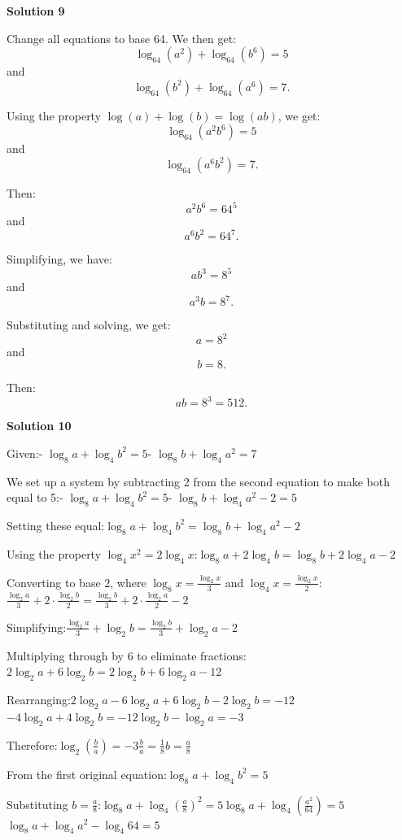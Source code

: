 \begin{enumerate}
 



\textbf{Solution 9}

Change all equations to base 64. We then get:
 \[\log_{64}(a^2) + \log_{64}(b^6) = 5\]and
 \[\log_{64}(b^2) + \log_{64}(a^6) = 7.\]

 Using the property \(\log(a) + \log(b) = \log(ab)\), we get:
 \[\log_{64}(a^2b^6) = 5\]and
 \[\log_{64}(a^6b^2) = 7.\]

 Then:
 \[a^2b^6 = 64^5\]and
 \[a^6b^2 = 64^7.\]

 Simplifying, we have:
 \[ab^3 = 8^5\]and
 \[a^3b = 8^7.\]

 Substituting and solving, we get:
 \[a = 8^2\]and
 \[b = 8.\]

 Then:
 \[ab = 8^3 = 512.\]




\textbf{Solution 10}

Given:- $\log_8 a + \log_4 b^2 = 5$- $\log_8 b + \log_4 a^2 = 7$

 We set up a system by subtracting 2 from the second equation to make both equal to 5:- $\log_8 a + \log_4 b^2 = 5$- $\log_8 b + \log_4 a^2 - 2 = 5$

 Setting these equal:$\log_8 a + \log_4 b^2 = \log_8 b + \log_4 a^2 - 2$

 Using the property $\log_4 x^2 = 2\log_4 x$:$\log_8 a + 2\log_4 b = \log_8 b + 2\log_4 a - 2$

 Converting to base 2, where $\log_8 x = \frac{\log_2 x}{3}$ and $\log_4 x = \frac{\log_2 x}{2}$:$\frac{\log_2 a}{3} + 2\cdot\frac{\log_2 b}{2} = \frac{\log_2 b}{3} + 2\cdot\frac{\log_2 a}{2} - 2$

 Simplifying:$\frac{\log_2 a}{3} + \log_2 b = \frac{\log_2 b}{3} + \log_2 a - 2$

 Multiplying through by 6 to eliminate fractions:$2\log_2 a + 6\log_2 b = 2\log_2 b + 6\log_2 a - 12$

 Rearranging:$2\log_2 a - 6\log_2 a + 6\log_2 b - 2\log_2 b = -12$$-4\log_2 a + 4\log_2 b = -12$$\log_2 b - \log_2 a = -3$

 Therefore:$\log_2\left(\frac{b}{a}\right) = -3$$\frac{b}{a} = \frac{1}{8}$$b = \frac{a}{8}$

 From the first original equation:$\log_8 a + \log_4 b^2 = 5$

 Substituting $b = \frac{a}{8}$:$\log_8 a + \log_4 \left(\frac{a}{8}\right)^2 = 5$$\log_8 a + \log_4 \left(\frac{a^2}{64}\right) = 5$$\log_8 a + \log_4 a^2 - \log_4 64 = 5$


\end{enumerate}
